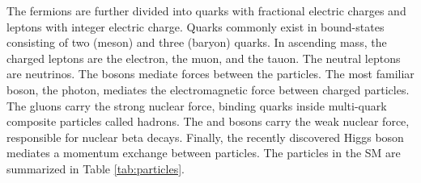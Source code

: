 The fermions are further divided into quarks with fractional electric charges and leptons with integer electric charge.
Quarks commonly exist in bound-states consisting of two (meson) and three (baryon) quarks.
In ascending mass, the charged leptons are the electron, the muon, and the tauon.
The neutral leptons are neutrinos.
The bosons mediate forces between the particles.
The most familiar boson, the photon, mediates the electromagnetic force between charged particles.
The gluons carry the strong nuclear force, binding quarks inside multi-quark composite particles called hadrons.
The \W and \Z bosons carry the weak nuclear force, responsible for nuclear beta decays.
Finally, the recently discovered Higgs boson mediates a momentum exchange between particles.
The particles in the SM are summarized in Table \ref{tab:particles}.

